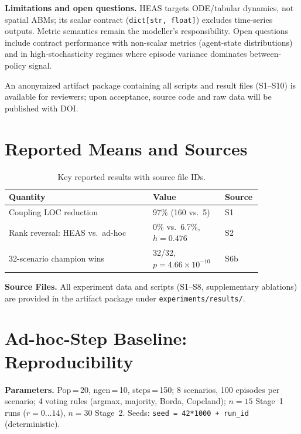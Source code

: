 \documentclass{wscpaperproc}
\begin{document}
\textbf{Limitations and open questions.} HEAS targets ODE/tabular dynamics, not
spatial ABMs; its scalar contract (\texttt{dict[str, float]}) excludes
time-series outputs. Metric semantics remain the modeller's responsibility.
Open questions include contract performance with non-scalar metrics (agent-state
distributions) and in high-stochasticity regimes where episode variance
dominates between-policy signal.

An anonymized artifact package containing all scripts and result files (S1--S10)
is available for reviewers; upon acceptance, source code and raw data will be
published with DOI.

\appendix
\section{Reported Means and Sources}

\begin{table}[ht]
\caption{Key reported results with source file IDs.}
\label{tab:appendix-results}
\centering\small
\begin{tabular}{p{0.52\linewidth}p{0.26\linewidth}p{0.08\linewidth}}
\toprule
Quantity & Value & Source \\
\midrule
Coupling LOC reduction & 97\% (160 vs.\ 5) & S1 \\
Rank reversal: HEAS vs.\ ad-hoc & 0\% vs.\ 6.7\%, $h\!=\!0.476$ & S2 \\
32-scenario champion wins & 32/32, $p\!=\!4.66\!\times\!10^{-10}$ & S6b \\
\bottomrule
\end{tabular}
\end{table}

\noindent\textbf{Source Files.} All experiment data and scripts (S1--S8, supplementary ablations)
are provided in the artifact package under \texttt{experiments/results/}.

\section{Ad-hoc-Step Baseline: Reproducibility}
\label{app:adhoc}

\textbf{Parameters.} Pop\,=\,20, ngen\,=\,10, steps\,=\,150; 8 scenarios,
100 episodes per scenario; 4 voting rules (argmax, majority, Borda, Copeland);
$n\!=\!15$ Stage~1 runs ($r\!=\!0\ldots14$), $n\!=\!30$ Stage~2. Seeds:
\texttt{seed = 42*1000 + run\_id} (deterministic).
\end{document}

